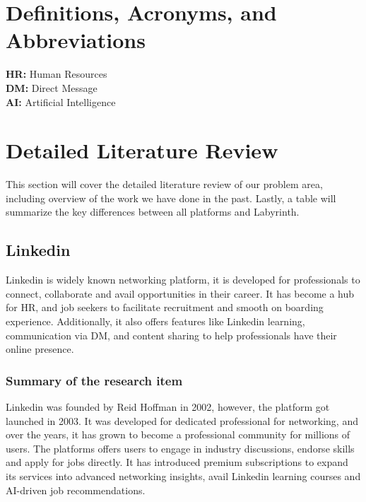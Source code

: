 \documentclass{FastFyp}
\begin{document}
\section{Definitions, Acronyms, and Abbreviations}
\textbf{HR: } Human Resources \\
\textbf{DM: } Direct Message \\
\textbf{AI: } Artificial Intelligence \\

\section{Detailed Literature Review} 
This section will cover the detailed literature review of our problem area, including overview of the work we have done in the past. Lastly, a table will summarize the key differences between all platforms and Labyrinth.



\subsection{Linkedin}
Linkedin is widely known networking platform, it is developed for professionals to connect, collaborate and avail opportunities in their career. It has become a hub for HR, and job seekers to facilitate recruitment and smooth on boarding experience. Additionally, it also offers features like Linkedin learning, communication via DM, and content sharing to help professionals have their online presence. 

\subsubsection{Summary of the research item}
Linkedin was founded by Reid Hoffman in 2002, however, the platform got launched in 2003. It was developed for dedicated professional for networking, and over the years, it has grown to become a professional community for millions of users. The platforms offers users to engage in industry discussions, endorse skills and apply for jobs directly. It has introduced premium subscriptions to expand its services into advanced networking insights, avail Linkedin learning courses and AI-driven job recommendations.
\end{document}
